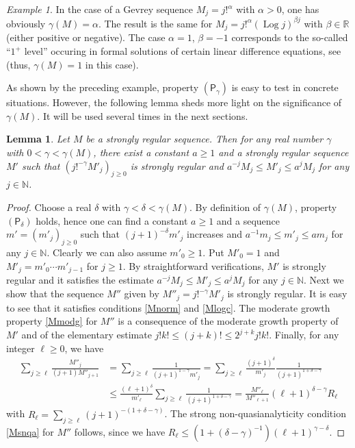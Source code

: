 \documentclass[a4paper]{amsart}
\theoremstyle{plain}
\newtheorem{lem}[subsubsection]{Lemma}
\theoremstyle{definition}
\theoremstyle{remark}
\newtheorem*{exam}{Example}
\DeclareMathOperator{\Log}{Log}
\begin{document}
\begin{exam} In the case of a Gevrey sequence $ M_j=j!^\alpha $ with $ \alpha>0 $,  one has obviously $ \gamma(M)=\alpha $. The result is the same for 
$ M_j=j!^\alpha(\Log j)^{\beta j} $ with $ \beta\in\mathbb{R} $ (either positive or negative). The case $ \alpha=1 $, $ \beta=-1 $ corresponds to the so-called
``$ 1^+$ level'' occuring in formal solutions of certain linear difference equations,
see \cite{Ecalle} (thus, $ \gamma(M)=1 $ in this case).
\end{exam}

As shown by the preceding example, property $ (\mathsf{P}_\gamma) $ is easy to test in concrete situations. However, the following lemma sheds more light
on the significance of $ \gamma(M) $. It will be used several times in the next sections.

\begin{lem}\label{light}
Let $ M $ be a strongly regular sequence. Then for any real number $ \gamma $ with
$ 0<\gamma<\gamma(M) $, there exist a constant $ a\geq 1 $ and a strongly regular sequence $ M' $ such that 
$ (j!^{-\gamma}M'_j)_{j\geq 0} $ is strongly regular and 
$ a^{-j}M_j\leq M'_j\leq a^jM_j $ for any $ j\in\mathbb{N} $.
\end{lem}
\begin{proof}
Choose a real $ \delta $ with
$ \gamma<\delta<\gamma(M) $. By definition of $ \gamma(M) $, property
$ (\mathsf{P}_\delta) $ holds, hence
one can find a constant $ a\geq 1 $ 
and a sequence $ m'=(m'_j)_{j\geq 0} $ such that $ (j+1)^{-\delta}m'_j $ increases and
$ a^{-1}m_j\leq m'_j\leq am_j $ for any $ j\in\mathbb{N} $. 
Clearly we can also assume $ m'_0\geq 1 $. 
Put $ M'_0=1 $ and $ M'_j=m'_0\cdots m'_{j-1} $ for $ j\geq 1 $. By straightforward verifications, $ M' $ is strongly regular and it satisfies the estimate
$ a^{-j}M_j\leq M'_j\leq a^j M_j $ for any $ j\in\mathbb{N} $. 
Next we show that the
sequence $ M'' $ given by $ M''_j=j!^{-\gamma}M'_j $ is strongly regular. It 
is easy to see that it satisfies conditions \eqref{Mnorm} and \eqref{Mlogc}. The moderate growth
property \eqref{Mmodg} for $ M'' $ is a consequence of the moderate growth property
of $ M' $ and of the elementary estimate $ j!k!\leq (j+k)!\leq 2^{j+k}j!k! $.
Finally, for any integer
$ \ell\geq 0 $, we have
\begin{equation*}
\begin{split}
\sum_{j\geq\ell}\frac{M''_j}{(j+1)M''_{j+1}}
& =\sum_{j\geq\ell}\frac{1}{(j+1)^{1-\gamma}m'_j}=\sum_{j\geq\ell}\frac{(j+1)^\delta}
{m'_j}\frac{1}{(j+1)^{1+\delta-\gamma}}
 \\
& \leq \frac{(\ell+1)^\delta}
{m'_\ell}\sum_{j\geq\ell}\frac{1}{(j+1)^{1+\delta-\gamma}}
= \frac{M''_\ell}{M''_{\ell+1}}(\ell+1)^{\delta-\gamma}R_\ell
\end{split}
\end{equation*}
with $ R_\ell=\sum_{j\geq\ell}(j+1)^{-(1+\delta-\gamma)} $.
The strong non-quasianalyticity condition \eqref{Msnqa} for $ M'' $ follows, since 
we have $ R_\ell\leq 
(1+({\delta-\gamma})^{-1})(\ell+1)^{\gamma-\delta} $.
\end{proof}
\end{document}
